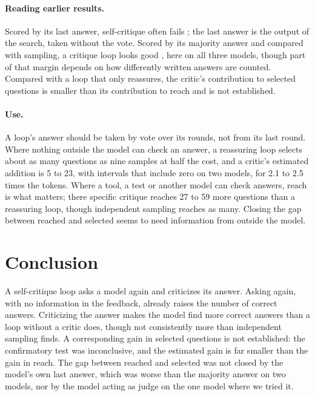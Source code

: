 \documentclass[11pt]{article}
\begin{document}
\paragraph{Reading earlier results.}
Scored by its last answer, self-critique often fails \citep{huang2024cannot,stechly2024selfverification}; the last answer is the output of the search, taken without the vote.
Scored by its majority answer and compared with sampling, a critique loop looks good \citep{bilal2026refining}, here on all three models, though part of that margin depends on how differently written answers are counted.
Compared with a loop that only reassures, the critic's contribution to selected questions is smaller than its contribution to reach and is not established.

\paragraph{Use.}
A loop's answer should be taken by vote over its rounds, not from its last round.
Where nothing outside the model can check an answer, a reassuring loop selects about as many questions as nine samples at half the cost, and a critic's estimated addition is 5 to 23, with intervals that include zero on two models, for 2.1 to 2.5 times the tokens.
Where a tool, a test or another model can check answers, reach is what matters; there specific critique reaches 27 to 59 more questions than a reassuring loop, though independent sampling reaches as many.
Closing the gap between reached and selected seems to need information from outside the model.

\section{Conclusion}

A self-critique loop asks a model again and criticizes its answer.
Asking again, with no information in the feedback, already raises the number of correct answers.
Criticizing the answer makes the model find more correct answers than a loop without a critic does, though not consistently more than independent sampling finds.
A corresponding gain in selected questions is not established: the confirmatory test was inconclusive, and the estimated gain is far smaller than the gain in reach.
The gap between reached and selected was not closed by the model's own last answer, which was worse than the majority answer on two models, nor by the model acting as judge on the one model where we tried it.
\end{document}
